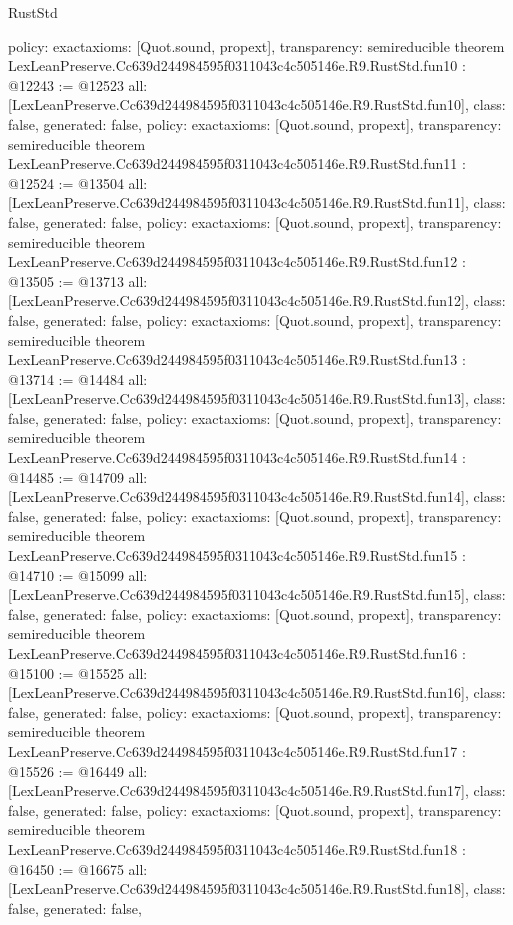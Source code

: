 \begin{lexlean}{RustStd}
\begin{coremodule}
{  policy: exact{axioms: [Quot.sound, propext]},
  transparency: semireducible
}
theorem LexLeanPreserve.Cc639d244984595f0311043c4c505146e.R9.RustStd.fun10 : @12243 := @12523 {
  all: [LexLeanPreserve.Cc639d244984595f0311043c4c505146e.R9.RustStd.fun10],
  class: false,
  generated: false,
  policy: exact{axioms: [Quot.sound, propext]},
  transparency: semireducible
}
theorem LexLeanPreserve.Cc639d244984595f0311043c4c505146e.R9.RustStd.fun11 : @12524 := @13504 {
  all: [LexLeanPreserve.Cc639d244984595f0311043c4c505146e.R9.RustStd.fun11],
  class: false,
  generated: false,
  policy: exact{axioms: [Quot.sound, propext]},
  transparency: semireducible
}
theorem LexLeanPreserve.Cc639d244984595f0311043c4c505146e.R9.RustStd.fun12 : @13505 := @13713 {
  all: [LexLeanPreserve.Cc639d244984595f0311043c4c505146e.R9.RustStd.fun12],
  class: false,
  generated: false,
  policy: exact{axioms: [Quot.sound, propext]},
  transparency: semireducible
}
theorem LexLeanPreserve.Cc639d244984595f0311043c4c505146e.R9.RustStd.fun13 : @13714 := @14484 {
  all: [LexLeanPreserve.Cc639d244984595f0311043c4c505146e.R9.RustStd.fun13],
  class: false,
  generated: false,
  policy: exact{axioms: [Quot.sound, propext]},
  transparency: semireducible
}
theorem LexLeanPreserve.Cc639d244984595f0311043c4c505146e.R9.RustStd.fun14 : @14485 := @14709 {
  all: [LexLeanPreserve.Cc639d244984595f0311043c4c505146e.R9.RustStd.fun14],
  class: false,
  generated: false,
  policy: exact{axioms: [Quot.sound, propext]},
  transparency: semireducible
}
theorem LexLeanPreserve.Cc639d244984595f0311043c4c505146e.R9.RustStd.fun15 : @14710 := @15099 {
  all: [LexLeanPreserve.Cc639d244984595f0311043c4c505146e.R9.RustStd.fun15],
  class: false,
  generated: false,
  policy: exact{axioms: [Quot.sound, propext]},
  transparency: semireducible
}
theorem LexLeanPreserve.Cc639d244984595f0311043c4c505146e.R9.RustStd.fun16 : @15100 := @15525 {
  all: [LexLeanPreserve.Cc639d244984595f0311043c4c505146e.R9.RustStd.fun16],
  class: false,
  generated: false,
  policy: exact{axioms: [Quot.sound, propext]},
  transparency: semireducible
}
theorem LexLeanPreserve.Cc639d244984595f0311043c4c505146e.R9.RustStd.fun17 : @15526 := @16449 {
  all: [LexLeanPreserve.Cc639d244984595f0311043c4c505146e.R9.RustStd.fun17],
  class: false,
  generated: false,
  policy: exact{axioms: [Quot.sound, propext]},
  transparency: semireducible
}
theorem LexLeanPreserve.Cc639d244984595f0311043c4c505146e.R9.RustStd.fun18 : @16450 := @16675 {
  all: [LexLeanPreserve.Cc639d244984595f0311043c4c505146e.R9.RustStd.fun18],
  class: false,
  generated: false,
}
\end{coremodule}
\end{lexlean}
